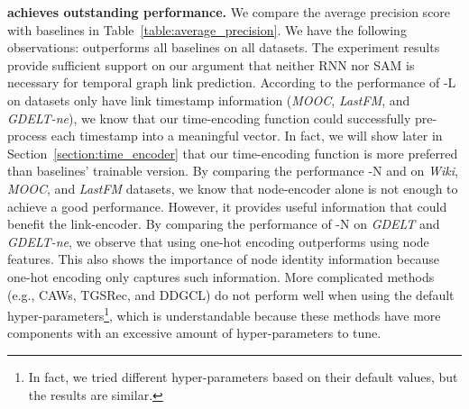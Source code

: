 \noindent\textbf{\our achieves outstanding performance.}
We compare the average precision score with baselines in Table~\ref{table:average_precision}. We have the following observations: 
 \our outperforms all baselines on all datasets. 
The experiment results provide sufficient support on our argument that neither RNN nor SAM is necessary for temporal graph link prediction.
 According to the performance of \oure-L on datasets only have link timestamp information (\textit{MOOC}, \textit{LastFM}, and \textit{GDELT-ne}), we know that our time-encoding function could successfully pre-process each timestamp into a meaningful vector. In fact,  we will show later in Section~\ref{section:time_encoder} that our time-encoding function is more preferred than baselines' trainable version.
 By comparing the performance \oure-N and \our on \textit{Wiki}, \textit{MOOC}, and \textit{LastFM} datasets, we know that node-encoder alone is not enough to achieve a good performance. However, it provides useful information that could benefit the link-encoder.
 By comparing the performance of \oure-N on \textit{GDELT} and \textit{GDELT-ne}, we observe that using one-hot encoding outperforms using node features. This also shows the importance of node identity information because one-hot encoding only captures such information.
 More complicated methods (e.g., CAWs, TGSRec, and DDGCL) do not perform well when using the default hyper-parameters\footnote{In fact, we tried different hyper-parameters based on their default values, but the results are similar.}, which is understandable because these methods have more components with an excessive amount of hyper-parameters to tune.

